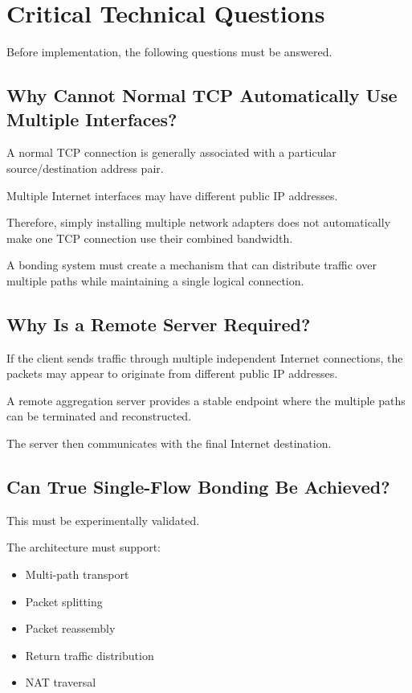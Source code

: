 \documentclass[12pt,a4paper]{article}
\begin{document}

\section{Critical Technical Questions}

Before implementation, the following questions must be answered.

\subsection{Why Cannot Normal TCP Automatically Use Multiple Interfaces?}

A normal TCP connection is generally associated with a particular source/destination address pair.

Multiple Internet interfaces may have different public IP addresses.

Therefore, simply installing multiple network adapters does not automatically make one TCP connection use their combined bandwidth.

A bonding system must create a mechanism that can distribute traffic over multiple paths while maintaining a single logical connection.

\subsection{Why Is a Remote Server Required?}

If the client sends traffic through multiple independent Internet connections, the packets may appear to originate from different public IP addresses.

A remote aggregation server provides a stable endpoint where the multiple paths can be terminated and reconstructed.

The server then communicates with the final Internet destination.

\subsection{Can True Single-Flow Bonding Be Achieved?}

This must be experimentally validated.

The architecture must support:

\begin{itemize}
    \item Multi-path transport
    \item Packet splitting
    \item Packet reassembly
    \item Return traffic distribution
    \item NAT traversal
\end{itemize}
\end{document}
